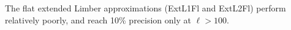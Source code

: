 \documentclass[fleqn,usenatbib]{mnras} %
\begin{document}
The flat extended Limber approximations (ExtL1Fl and ExtL2Fl) perform relatively poorly, and
reach 10\% precision only at $\ell > 100$.

\begin{figure}

  \begin{center}
  \end{center}


\end{figure}
\end{document}
